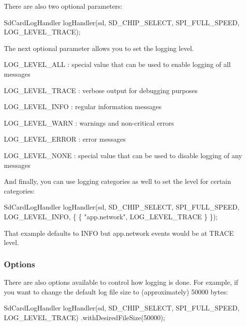 There are also two optional parameters\+:


\begin{DoxyCode}
SdCardLogHandler logHandler(sd, SD\_CHIP\_SELECT, SPI\_FULL\_SPEED, LOG\_LEVEL\_TRACE);
\end{DoxyCode}


The next optional parameter allows you to set the logging level.


\begin{DoxyItemize}
\item {\ttfamily L\+O\+G\+\_\+\+L\+E\+V\+E\+L\+\_\+\+A\+LL} \+: special value that can be used to enable logging of all messages
\item {\ttfamily L\+O\+G\+\_\+\+L\+E\+V\+E\+L\+\_\+\+T\+R\+A\+CE} \+: verbose output for debugging purposes
\item {\ttfamily L\+O\+G\+\_\+\+L\+E\+V\+E\+L\+\_\+\+I\+N\+FO} \+: regular information messages
\item {\ttfamily L\+O\+G\+\_\+\+L\+E\+V\+E\+L\+\_\+\+W\+A\+RN} \+: warnings and non-\/critical errors
\item {\ttfamily L\+O\+G\+\_\+\+L\+E\+V\+E\+L\+\_\+\+E\+R\+R\+OR} \+: error messages
\item {\ttfamily L\+O\+G\+\_\+\+L\+E\+V\+E\+L\+\_\+\+N\+O\+NE} \+: special value that can be used to disable logging of any messages
\end{DoxyItemize}

And finally, you can use logging categories as well to set the level for certain categories\+:


\begin{DoxyCode}
SdCardLogHandler logHandler(sd, SD\_CHIP\_SELECT, SPI\_FULL\_SPEED, LOG\_LEVEL\_INFO, \{
    \{ "app.network", LOG\_LEVEL\_TRACE \} 
\});
\end{DoxyCode}


That example defaults to I\+N\+FO but app.\+network events would be at T\+R\+A\+CE level.

\subsubsection*{Options}

There are also options available to control how logging is done. For example, if you want to change the default log file size to (approximately) 50000 bytes\+:


\begin{DoxyCode}
SdCardLogHandler logHandler(sd, SD\_CHIP\_SELECT, SPI\_FULL\_SPEED, LOG\_LEVEL\_TRACE)
    .withDesiredFileSize(50000);
\end{DoxyCode}


